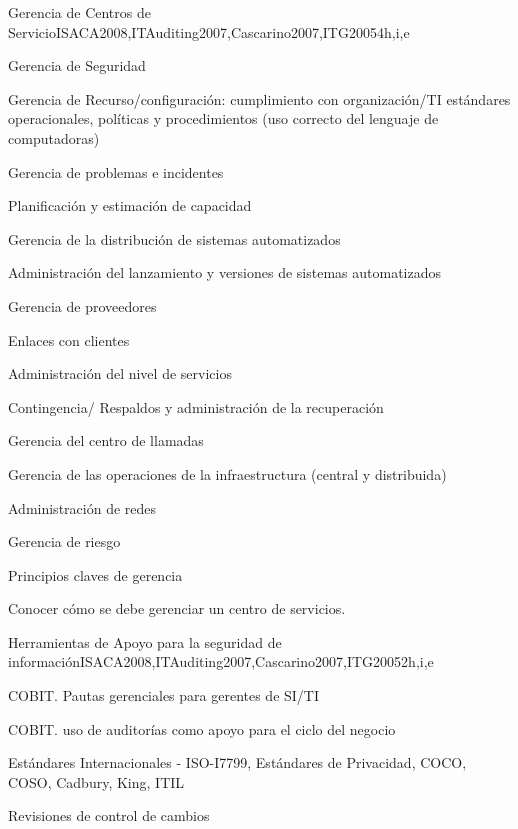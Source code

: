 \begin{syllabus}
    \begin{unit}{Gerencia de Centros de Servicio}{}{ISACA2008,ITAuditing2007,Cascarino2007,ITG2005}{4}{h,i,e}
    \begin{topics}
    \item Gerencia de Seguridad
    \item Gerencia de Recurso/configuración: cumplimiento con organización/TI estándares operacionales, políticas y procedimientos (uso correcto del lenguaje de computadoras)
    \item Gerencia de problemas e incidentes 
    \item Planificación y estimación de capacidad
    \item Gerencia de la distribución de sistemas automatizados
    \item Administración del lanzamiento y versiones de sistemas automatizados
    \item Gerencia de proveedores
    \item Enlaces con clientes
    \item Administración del nivel de servicios
    \item Contingencia/ Respaldos y administración de la recuperación
    \item Gerencia del centro de llamadas
    \item Gerencia de las operaciones de la infraestructura (central y distribuida)
    \item Administración de redes
    \item Gerencia de riesgo
    \item Principios claves de gerencia
    \end{topics}
    \begin{learningoutcomes}
    \item Conocer cómo se debe gerenciar un centro de servicios.
    \end{learningoutcomes}
    \end{unit}
    
    \begin{unit}{Herramientas de Apoyo para la seguridad de información}{}{ISACA2008,ITAuditing2007,Cascarino2007,ITG2005}{2}{h,i,e}
    \begin{topics}
    \item COBIT. Pautas gerenciales para gerentes de SI/TI
    \item COBIT. uso de auditorías como apoyo para el ciclo del negocio
    \item Estándares Internacionales - ISO-I7799, Estándares de Privacidad, COCO, COSO, Cadbury, King, ITIL
    \item Revisiones de control de cambios
    \end{topics}
    

\end{unit}
\end{syllabus}
